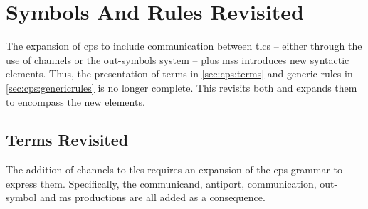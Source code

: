 \section{\label{sec:cps:termsandrulesrevisited}Symbols And Rules Revisited}
The expansion of \gls{cps} to include communication between \glspl{tlc} -- either through the use of channels or the out-symbols system -- plus \glspl{ms} introduces new syntactic elements.  Thus, the presentation of terms in \cref{sec:cps:terms} and generic rules in \cref{sec:cps:genericrules} is no longer complete.  This  revisits both and expands them to encompass the new elements.

\subsection{\label{sec:cps:termssrevisited}Terms Revisited}

The addition of channels to \glspl{tlc} requires an expansion of the \gls{cps} grammar to express them.  Specifically, the communicand, antiport, communication, out-symbol and \gls{ms} productions are all added as a consequence.

